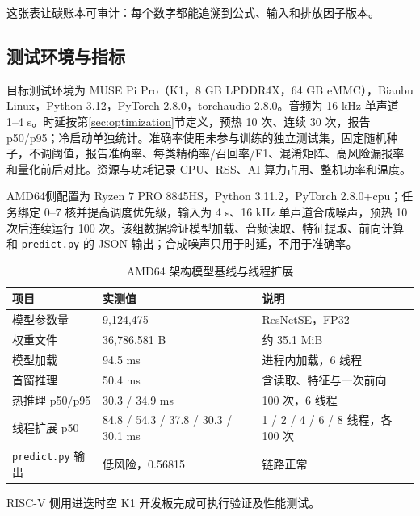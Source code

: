 \documentclass[UTF8,11pt,a4paper,fontset=none]{ctexart}
\begin{document}
这张表让碳账本可审计：每个数字都能追溯到公式、输入和排放因子版本。

\subsection{测试环境与指标}

目标测试环境为 MUSE Pi Pro（K1，8 GB LPDDR4X，64 GB eMMC），Bianbu Linux，Python 3.12，PyTorch 2.8.0，torchaudio 2.8.0。音频为 16 kHz 单声道 1--4 s。时延按第\ref{sec:optimization}节定义，预热 10 次、连续 30 次，报告 p50/p95；冷启动单独统计。准确率使用未参与训练的独立测试集，固定随机种子，不调阈值，报告准确率、每类精确率/召回率/F1、混淆矩阵、高风险漏报率和量化前后对比。资源与功耗记录 CPU、RSS、AI 算力占用、整机功率和温度。

AMD64侧配置为 Ryzen 7 PRO 8845HS，Python 3.11.2，PyTorch 2.8.0+cpu；任务绑定 0--7 核并提高调度优先级，输入为 4 s、16 kHz 单声道合成噪声，预热 10 次后连续运行 100 次。该组数据验证模型加载、音频读取、特征提取、前向计算和 \texttt{predict.py} 的 JSON 输出；合成噪声只用于时延，不用于准确率。

\begin{table}[htbp]
\centering
\small
\caption{AMD64 架构模型基线与线程扩展}
\label{tab:devbaseline}
\begin{tabular}{p{3.4cm}p{3.4cm}p{7.0cm}}
\toprule
项目 & 实测值 & 说明 \\
\midrule
模型参数量 & 9,124,475 & ResNetSE，FP32 \\
权重文件 & 36,786,581 B & 约 35.1 MiB \\
模型加载 & 94.5 ms & 进程内加载，6 线程 \\
首窗推理 & 50.4 ms & 含读取、特征与一次前向 \\
热推理 p50/p95 & 30.3 / 34.9 ms & 100 次，6 线程 \\
线程扩展 p50 & 84.8 / 54.3 / 37.8 / 30.3 / 30.1 ms & 1 / 2 / 4 / 6 / 8 线程，各 100 次 \\
\texttt{predict.py} 输出 & 低风险，0.56815 & 链路正常 \\
\bottomrule
\end{tabular}
\end{table}

RISC-V 侧用进迭时空 K1 开发板完成可执行验证及性能测试。
\end{document}
